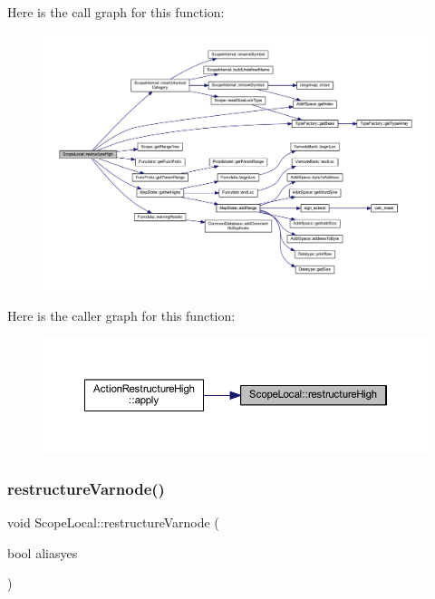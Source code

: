 Here is the call graph for this function\+:
\nopagebreak
\begin{figure}[H]
\begin{center}
\leavevmode
\includegraphics[width=350pt]{class_scope_local_a308e308109ca1964d49d6a3a539a9acf_cgraph}
\end{center}
\end{figure}
Here is the caller graph for this function\+:
\nopagebreak
\begin{figure}[H]
\begin{center}
\leavevmode
\includegraphics[width=350pt]{class_scope_local_a308e308109ca1964d49d6a3a539a9acf_icgraph}
\end{center}
\end{figure}
\mbox{\label{class_scope_local_a4f0d61de6d043ae92af2c2cf1836453a}} 
\subsubsection{\texorpdfstring{restructureVarnode()}{restructureVarnode()}}
{\footnotesize\ttfamily void Scope\+Local\+::restructure\+Varnode (\begin{DoxyParamCaption}\item[{bool}]{aliasyes }\end{DoxyParamCaption})}



